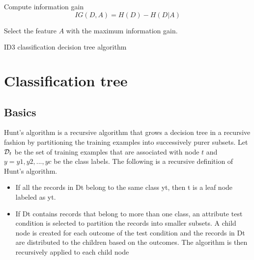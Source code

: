 \begin{refsection}
\begin{algorithm}[H]
{		
		
		Compute information gain
		$$IG(D, A) = H(D) - H(D|A)$$
	}
	
	Select the feature $A$ with the maximum information gain.
	
	
	\caption{ID3 classification decision tree algorithm}
\end{algorithm}




\section{Classification tree}

\subsection{Basics}


\begin{method}\cite[152]{tan2013introduction}
Hunt's algorithm is a recursive algorithm that grows a decision tree in a recursive fashion by partitioning the training examples into successively purer subsets. Let $\mathcal{D}_t$ be the set of training examples that are associated with node $t$ and $y = {y1, y2, . . . , yc}$ be
the class labels. The following is a recursive definition of Hunt's algorithm.
\begin{itemize}
	\item If all the records in Dt belong to the same class yt, then t is a leaf node labeled as yt.
	\item If Dt contains records that belong to more than one class, an attribute test condition is selected to partition the records into smaller subsets. A child node is created for each outcome of the test condition and the records in Dt are distributed to the children based on the outcomes. The algorithm is then recursively applied to each child node
\end{itemize}	
\end{method}


\end{refsection}
